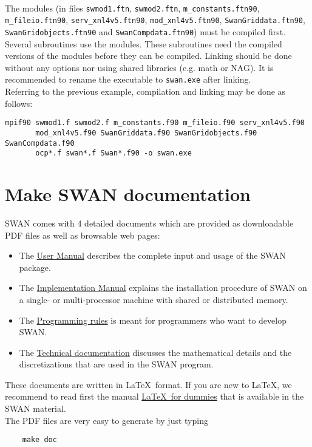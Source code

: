\documentclass[12pt]{book}
\begin{document}
\\[2ex]
\noindent
The modules (in files {\tt swmod1.ftn}, {\tt swmod2.ftn}, {\tt m\_constants.ftn90},
{\tt m\_fileio.ftn90}, {\tt serv\_xnl4v5.ftn90}, {\tt mod\_xnl4v5.ftn90},
{\tt SwanGriddata.ftn90}, {\tt SwanGridobjects.ftn90} and {\tt SwanCompdata.ftn90}) must be compiled first.
Several subroutines use the modules. These subroutines need the compiled versions of the modules before they can be compiled.
Linking should be done without any options nor using shared libraries (e.g. math or NAG). It is
recommended to rename the executable to {\tt swan.exe} after linking.
\\[2ex]
\noindent
Referring to the previous example, compilation and linking may be done as follows:
\begin{verbatim}
mpif90 swmod1.f swmod2.f m_constants.f90 m_fileio.f90 serv_xnl4v5.f90
       mod_xnl4v5.f90 SwanGriddata.f90 SwanGridobjects.f90 SwanCompdata.f90
       ocp*.f swan*.f Swan*.f90 -o swan.exe
\end{verbatim}

\newpage
\section{Make SWAN documentation} \label{sec:makedoc}

SWAN comes with 4 detailed documents which are provided as downloadable PDF files as well as browsable web pages:
\begin{itemize}
  \item The \underline{User Manual} describes the complete input and usage of the SWAN package.
  \item The \underline{Implementation Manual} explains the installation procedure of SWAN on a single- or multi-processor machine
        with shared or distributed memory.
  \item The \underline{Programming rules} is meant for programmers who want to develop SWAN.
  \item The \underline{Technical documentation} discusses the mathematical details and the discretizations that are used in the SWAN program.
\end{itemize}
These documents are written in \LaTeX~format. If you are new to \LaTeX, we recommend to read first the manual \underline{\LaTeX~for dummies}
that is available in the SWAN material.
\\[2ex]
\noindent
The PDF files are very easy to generate by just typing
\begin{verbatim}
    make doc
\end{verbatim}
\end{document}
